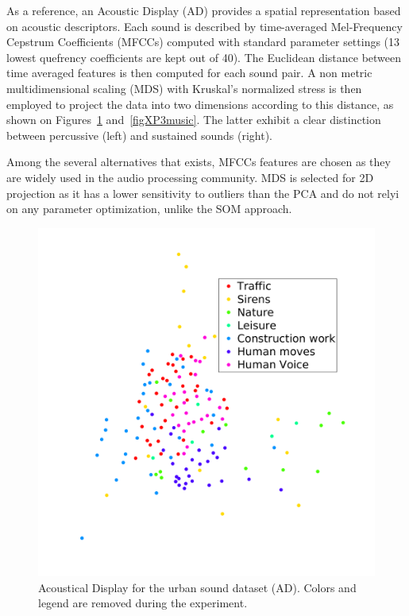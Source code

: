 \documentclass{aes2e}
\begin{document}
As a reference, an Acoustic Display (AD) provides a spatial representation based on acoustic descriptors. Each sound is described by time-averaged Mel-Frequency Cepstrum Coefficients (MFCCs) computed with standard parameter settings (13 lowest quefrency coefficients are kept out of 40). The Euclidean distance between time averaged features is then computed for each sound pair. A non metric multidimensional scaling (MDS) with Kruskal's normalized stress \cite{kruskal1964multidimensional} is then employed to project the data into two dimensions according to this distance, as shown on Figures~\ref{figXP3urban} and~\ref{figXP3music}. The latter exhibit a clear distinction between percussive (left) and sustained sounds (right).

Among the several alternatives that exists, MFCCs features are chosen as they are widely used in the audio processing community. MDS is selected for 2D projection as it has a lower sensitivity to outliers than the PCA and do not relyi on any parameter optimization, unlike the SOM approach. 

\begin{figure}[t]
\begin{center}
\includegraphics[width=\columnwidth]{gfx/urban_mds.png} 
\end{center}
\caption{\label{figXP3urban} Acoustical Display for the urban sound dataset (AD). Colors and legend are removed during the experiment.}
\end{figure}
\end{document}
